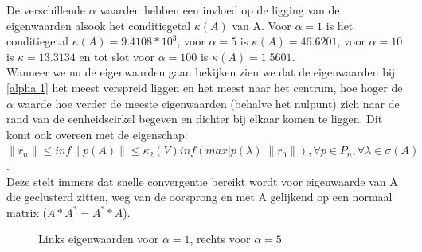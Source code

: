 De verschillende $\alpha$ waarden hebben een invloed op de ligging van de eigenwaarden alsook het conditiegetal $\kappa(A)$ van A. Voor $\alpha = 1$ is het conditiegetal $\kappa(A) = 9.4108*10^3$, voor $\alpha = 5$ is $\kappa(A) = 46.6201$, voor $\alpha = 10$ is $\kappa = 13.3134$ en tot slot voor $\alpha = 100$ is $\kappa(A) = 1.5601$.\\[12pt]

Wanneer we nu de eigenwaarden gaan bekijken zien we dat de eigenwaarden bij \ref{alpha 1} het meest verspreid liggen en het meest naar het centrum, hoe hoger de $\alpha$ waarde hoe verder de meeste eigenwaarden (behalve het nulpunt) zich naar de rand van de eenheidscirkel begeven en dichter bij elkaar komen te liggen. Dit komt ook overeen met de eigenschap: $\|r_{n}\| \leq inf\|p(A)\| \leq \kappa_{2}(V) inf (max |p(\lambda)|\|r_{0}\|),\forall p\in P_{n}, \forall\lambda\in \sigma(A)$.\\
 Deze stelt immers dat snelle convergentie bereikt wordt voor eigenwaarde van A die geclusterd zitten, weg van de oorsprong en met A gelijkend op een normaal matrix ($A*A^{*} = A^{*}*A$).

\begin{figure}[H]
  \centering
  \hfill
  \caption{Links eigenwaarden voor $\alpha = 1$, rechts voor $\alpha = 5$}
\end{figure}

